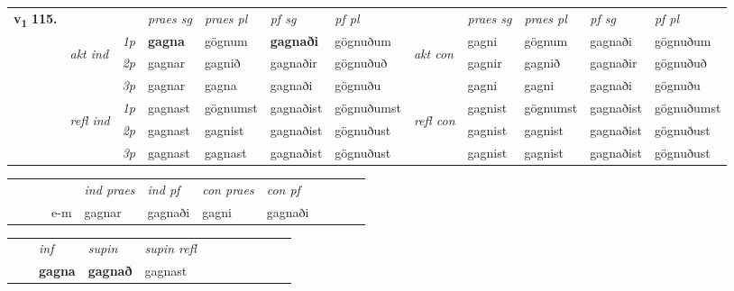 \begin{tabular}{llllllllllll} \toprule
\multirow{4}{*}{{{\textbf{v{\textsubscript{1}}} \Large{\textbf{115.}}}}}  & &   &  \textit{praes sg}  & \textit{praes pl}  &\textit{ pf sg} & \textit{pf pl} &  &  \textit{praes sg}  & \textit{praes pl}  & \textit{pf sg} & \textit{pf pl } \\*
	\cmidrule{4-7} \cmidrule{9-12}
 & \multirow{3}{*}{\begin{turn}{90}\textit{akt ind}\end{turn}} & {\textit{1p}} & \textbf{gagna} & gögnum    & \textbf{gagnaði} & gögnuðum & \multirow{3}{*}{\begin{turn}{90}\textit{akt con}\end{turn}} &gagni & gögnum & gagnaði & gögnuðum\\*
& &  {\textit{2p}} &  gagnar  & gagnið   & gagnaðir & gögnuðuð & & gagnir & gagnið & gagnaðir & gögnuðuð \\*
& &  {\textit{3p}} & gagnar & gagna   & gagnaði & gögnuðu & & gagni & gagni& gagnaði & gögnuðu  \\*
\cmidrule{4-7} \cmidrule{9-12}
 &\multirow{3}{*}{\begin{turn}{90}\textit{refl ind}\end{turn}} & {\textit{1p}} & gagnast & gögnumst    & gagnaðist & gögnuðumst & \multirow{3}{*}{\begin{turn}{90}\textit{refl con}\end{turn}}  &gagnist & gögnumst & gagnaðist & gögnuðumst\\*
 &&  {\textit{2p}} &  gagnast  & gagnist   & gagnaðist & gögnuðust & &gagnist & gagnist & gagnaðist & gögnuðust \\*
& &  {\textit{3p}} & gagnast & gagnast   & gagnaðist & gögnuðust & & gagnist & gagnist& gagnaðist & gögnuðust  \\*
\cmidrule{4-7} \cmidrule{9-12}
\end{tabular}


\begin{tabular}{llllllllllll}
 & &  & &  \textit{ind praes} & \textit{ind pf} & \textit{con praes} & \textit{con pf} \\*
&  & & e-m & gagnar & gagnaði & gagni & gagnaði \\*
\cmidrule{5-9}
\end{tabular}


\begin{tabular}{llllllllllll}
 & & \textit{inf}      & \textit{supin} & \textit{supin refl}      \\*
  & & \textbf{gagna}       &  \textbf{gagnað} & gagnast  \\*
\cmidrule{1-12}
\end{tabular}



